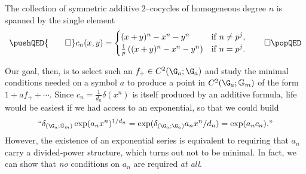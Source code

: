 \begin{corollary}
The collection of symmetric additive \(2\)--cocycles of homogeneous degree \(n\) is spanned by the single element
\[\pushQED{\qed}
c_n(x, y) = \begin{cases} (x + y)^n - x^n - y^n & \text{if \(n \ne p^j\)}, \\ \frac{1}{p} \left( (x + y)^n - x^n - y^n \right) & \text{if \(n = p^j\)}. \end{cases} \qedhere
\popQED\]
\end{corollary}

Our goal, then, is to select such an \(f_+ \in C^2(\G_a; \G_a)\) and study the minimal conditions needed on a symbol \(a\) to produce a point in \(C^2(\G_a; \Gm)\) of the form \(1 + af_+ + \cdots\).  Since \(c_n = \frac{1}{d_n} \delta(x^n)\) is itself produced by an additive formula, life would be easiest if we had access to an exponential, so that we could build \[\text{``\( \delta_{(\G_a; \Gm)} \exp(a_n x^n)^{1/d_n} = \exp(\delta_{(\G_a; \G_a)} a_n x^n / d_n) = \exp(a_n c_n). \)''}\]  However, the existence of an exponential series is equivalent to requiring that \(a_n\) carry a divided-power structure, which turns out not to be minimal.  In fact, we can show that \emph{no} conditions on \(a_n\) are required \emph{at all}.

